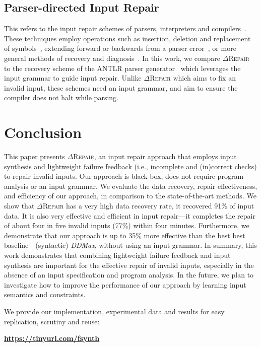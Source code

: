 \documentclass[acmsmall,screen,review,anonymous]{acmart}
\newcommand{\approach}{\textsc{$\Delta$Repair}\xspace}
\newcommand{\ddmax}{\textit{DDMax}\xspace}
\begin{document}
\subsection{Parser-directed Input Repair} %
This refers to the input repair schemes of parsers, interpreters and compilers~\cite{parr2011ll, diekmann2020dont, aho1972minimum, hammond1984survey, backhouse1979syntax}. 
These techniques employ operations such as insertion, deletion and replacement of symbols~\cite{anderson1981locally, cerecke2003locally, anderson1983assessment}, extending forward or backwards from a parser error~\cite{burke1982practical, mauney1982forward}, or more general methods of recovery and diagnosis~\cite{krawczyk1980error, aho1972minimum}. 
In this work, we compare \approach to the recovery scheme of the ANTLR parser generator~\cite{parr2011ll} which leverages the input grammar to guide input repair. %
Unlike \approach which aims to fix an invalid input, these schemes need an input grammar, and aim to ensure the compiler does not halt while parsing. 





\section{Conclusion}
\label{sec:conclusion}
This paper presents \approach, an input repair approach that employs input synthesis and lightweight failure feedback (i.e., incomplete and (in)correct checks) to repair invalid inputs. Our approach is black-box, does not require program analysis or an input grammar. We evaluate the data recovery, repair effectiveness, and efficiency of our approach, in comparison to the state-of-the-art methods. We show that \approach has a very high data recovery rate, it recovered 91\% of input data. 
It is also very effective and efficient in input repair---it completes the repair of about four in five invalid inputs (77\%) within four minutes. Furthermore, we demonstrate that our approach is up to 35\% more effective than the best 
best baseline---(syntactic) \ddmax, without using an input grammar. In summary, this work demonstrates that combining lightweight failure feedback and input synthesis are important for the effective repair of invalid inputs, especially in the absence of an input specification 
and program analysis.
In the future, we plan to investigate how to improve the performance of our approach by learning input semantics and constraints.

We provide our implementation, experimental data and results for easy replication, scrutiny and reuse:


 \begin{center}
 \textbf{\url{https://tinyurl.com/fsynth}}
 \end{center}









\end{document}
